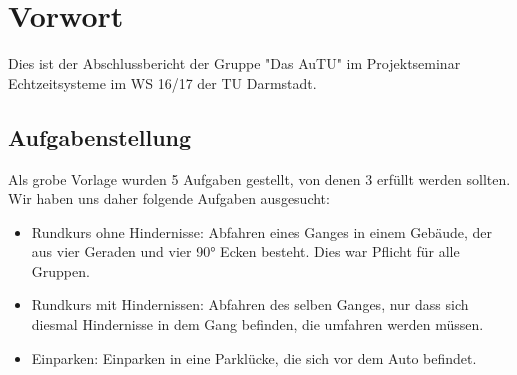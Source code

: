 \section{Vorwort}
Dies ist der Abschlussbericht der Gruppe "Das AuTU" im Projektseminar Echtzeitsysteme im WS 16/17 der TU Darmstadt.
\subsection{Aufgabenstellung}
Als grobe Vorlage wurden 5 Aufgaben gestellt, von denen 3 erfüllt werden sollten. Wir haben uns daher folgende Aufgaben ausgesucht:
\begin{itemize}
\item Rundkurs ohne Hindernisse: Abfahren eines Ganges in einem Gebäude, der aus vier Geraden und vier 90° Ecken besteht. Dies war Pflicht für alle Gruppen.
\item Rundkurs mit Hindernissen: Abfahren des selben Ganges, nur dass sich diesmal Hindernisse in dem Gang befinden, die umfahren werden müssen.
\item Einparken: Einparken in eine Parklücke, die sich vor dem Auto befindet.
\end{itemize}